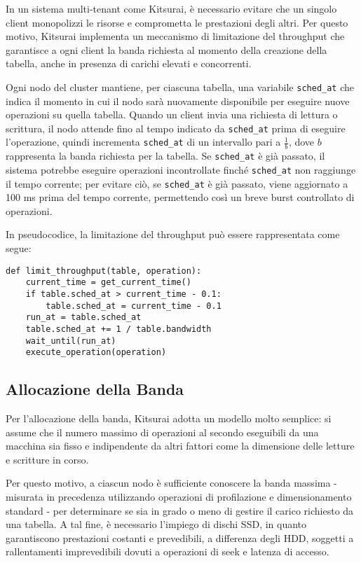 In un sistema multi-tenant come Kitsurai, è necessario evitare che un singolo client monopolizzi le risorse e comprometta le prestazioni degli altri.
Per questo motivo, Kitsurai implementa un meccanismo di limitazione del throughput che garantisce a ogni client la banda richiesta al momento della creazione della tabella, anche in presenza di carichi elevati e concorrenti.

Ogni nodo del cluster mantiene, per ciascuna tabella, una variabile \texttt{sched\_at} che indica il momento in cui il nodo sarà nuovamente disponibile per eseguire nuove operazioni su quella tabella.
Quando un client invia una richiesta di lettura o scrittura, il nodo attende fino al tempo indicato da \texttt{sched\_at} prima di eseguire l'operazione, quindi incrementa \texttt{sched\_at} di un intervallo pari a $\displaystyle \frac{1}{b}$, dove $b$ rappresenta la banda richiesta per la tabella.
Se \texttt{sched\_at} è già passato, il sistema potrebbe eseguire operazioni incontrollate finché \texttt{sched\_at} non raggiunge il tempo corrente; per evitare ciò, se \texttt{sched\_at} è già passato, viene aggiornato a 100 ms prima del tempo corrente, permettendo così un breve burst controllato di operazioni.

\begin{samepage}
\noindent In pseudocodice, la limitazione del throughput può essere rappresentata come segue:
\begin{verbatim}
def limit_throughput(table, operation):
    current_time = get_current_time()
    if table.sched_at > current_time - 0.1:
        table.sched_at = current_time - 0.1
    run_at = table.sched_at
    table.sched_at += 1 / table.bandwidth
    wait_until(run_at)
    execute_operation(operation)
\end{verbatim}
\end{samepage}

\subsection{Allocazione della Banda}
\label{subsec:allocazione-banda}

Per l'allocazione della banda, Kitsurai adotta un modello molto semplice: si assume che il numero massimo di operazioni al secondo eseguibili da una macchina sia fisso e indipendente da altri fattori come la dimensione delle letture e scritture in corso.

Per questo motivo, a ciascun nodo è sufficiente conoscere la banda massima - misurata in precedenza utilizzando operazioni di profilazione e dimensionamento standard - per determinare se sia in grado o meno di gestire il carico richiesto da una tabella.
A tal fine, è necessario l'impiego di dischi SSD, in quanto garantiscono prestazioni costanti e prevedibili, a differenza degli HDD, soggetti a rallentamenti imprevedibili dovuti a operazioni di seek e latenza di accesso.

